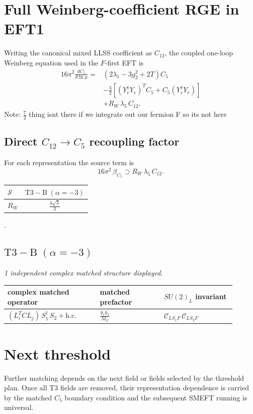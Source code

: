 \documentclass[9pt]{article}
\begin{document}
\section*{Full Weinberg-coefficient RGE in EFT1}
Writing the canonical mixed LLSS coefficient as $C_{12}$, the coupled one-loop Weinberg equation used in the $F$-first EFT is
\begin{align}
16\pi^2\frac{dC_5}{d\ln\mu}={}&(2\lambda_1-3g_2^2+2T)C_5\\
&-\frac32\left[(Y_e^\dagger Y_e)^T C_5+C_5(Y_e^\dagger Y_e)\right]\\
&+R_W\,\lambda_5\,C_{12}.
\end{align}
Note: $\frac{7}{2}$ thing isnt there if we integrate out our fermion F so its not here \subsection*{Direct $C_{12}\to C_5$ recoupling factor}
For each representation the source term is
\[16\pi^2\,\beta_{C_5}\supset R_W\,\lambda_5\,C_{12}.\]
\begin{longtable}{@{}lc@{}}
\toprule
$\mathcal{S}$ & $ \mathrm{T3-B}\;(\alpha=-3) $ \\
\midrule
$R_W$ & $ \frac{4 \sqrt{3}}{3} $ \\
\bottomrule
\end{longtable}
.
\subsection*{$ \mathrm{T3-B}\;(\alpha=-3) $}
\textit{1 independent complex matched structure displayed. }
\begin{longtable}{@{}p{0.36\linewidth}p{0.25\linewidth}p{0.29\linewidth}@{}}
\toprule
complex matched operator & matched prefactor & $SU(2)_L$ invariant \\
\midrule
$ (L_i^T C L_j)\,S_1^\dagger\,S_2+\mathrm{h.c.} $ & $ \frac{\overline{y_{1}} \overline{y_{2}}}{M_F} $ & $ \mathcal{C}_{LS_1F}\,\mathcal{C}_{LS_2F} $ \\
\bottomrule
\end{longtable}
\section*{Next threshold}
Further matching depends on the next field or fields selected by the threshold plan.  Once all T3 fields are removed, their representation dependence is carried by the matched $C_5$ boundary condition and the subsequent SMEFT running is universal.
\end{document}
